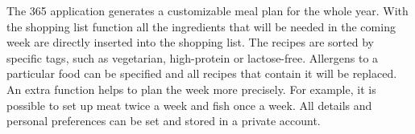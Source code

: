 The 365 application generates a customizable meal plan for the whole year.
With the shopping list function all the ingredients that will be needed in the coming week are directly inserted into the shopping list.
The recipes are sorted by specific tags, such as vegetarian, high-protein or lactose-free. Allergens to a particular food can be specified and all recipes that contain it will be replaced. An extra function helps to plan the week more precisely. For example, it is possible to set up meat twice a week and fish once a week. All details and personal preferences can be set and stored in a private account.